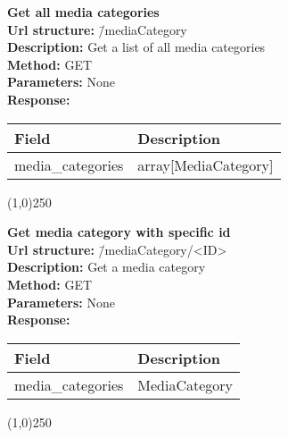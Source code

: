 \documentclass[11pt]{article}
\begin{document}
\begin{tabbing}
\textbf{Get all media categories} \\
\textcolor{black!60}{\textbf{Url structure:}} \hspace{0.2in} \= /mediaCategory \\
\textcolor{black!60}{\textbf{Description:}}  \> Get a list of all media categories \\
\textcolor{black!60}{\textbf{Method:}} \> GET \\
\textcolor{black!60}{\textbf{Parameters:}} \> None \\
\textcolor{black!60}{\textbf{Response:}} \\ \>
\begin{tabular}{|l|l|}
\hline
 Field                          &  Description           \\
\hline
 media\_categories  &  array[MediaCategory]  \\
\hline
\end{tabular}
\end{tabbing}

\begin{center}\line(1,0){250}\end{center}

\begin{tabbing}
\textbf{Get media category with specific id} \\
\textcolor{black!60}{\textbf{Url structure:}} \hspace{0.2in} \= /mediaCategory/<ID> \\
\textcolor{black!60}{\textbf{Description:}}  \> Get a media category \\
\textcolor{black!60}{\textbf{Method:}} \> GET \\
\textcolor{black!60}{\textbf{Parameters:}} \> None \\
\textcolor{black!60}{\textbf{Response:}} \\ \>
\begin{tabular}{|l|l|}
\hline
 Field                          &  Description    \\
\hline
 media\_categories  &  MediaCategory  \\
\hline
\end{tabular}
\end{tabbing}

\begin{center}\line(1,0){250}\end{center}
\end{document}
